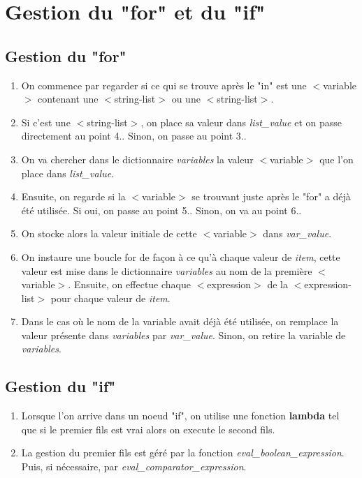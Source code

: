 \documentclass[a4paper, 12pt]{article}
\begin{document}
\section{Gestion du "for" et du "if"}
\subsection{Gestion du "for"}
\begin{enumerate}
    \item On commence par regarder si ce qui se trouve après le "in" est une $<$variable$>$ contenant une $<$string-list$>$ ou une $<$string-list$>$.
    \item Si c'est une $<$string-list$>$, on place sa valeur dans \textit{list\_value} et on passe directement au point 4.. Sinon, on passe au point 3..
    \item On va chercher dans le dictionnaire \textit{variables} la valeur $<$variable$>$ que l'on place dans \textit{list\_value}.
    \item Ensuite, on regarde si la $<$variable$>$ se trouvant juste après le "for" a déjà été utilisée. Si oui, on passe au point 5.. Sinon, on va au point 6..
    \item On stocke alors la valeur initiale de cette $<$variable$>$ dans \textit{var\_value}.
    \item On instaure une boucle for de façon à ce qu'à chaque valeur de \textit{item}, cette valeur est mise dans le dictionnaire \textit{variables} au nom de la première $<$variable$>$. Ensuite, on effectue chaque $<$expression$>$ de la $<$expression-list$>$ pour chaque valeur de \textit{item}.
    \item Dans le cas où le nom de la variable avait déjà été utilisée, on remplace la valeur présente dans \textit{variables} par \textit{var\_value}. Sinon, on retire la variable de \textit{variables}.
\end{enumerate}
\subsection{Gestion du "if"}
\begin{enumerate}
    \item Lorsque l'on arrive dans un noeud "if", on utilise une fonction \textbf{lambda} tel que si le premier fils est vrai alors on execute le second fils.
    \item La gestion du premier fils est géré par la fonction \textit{eval\_boolean\_expression}. Puis, si nécessaire, par \textit{eval\_comparator\_expression}.
\end{enumerate}
\end{document}
